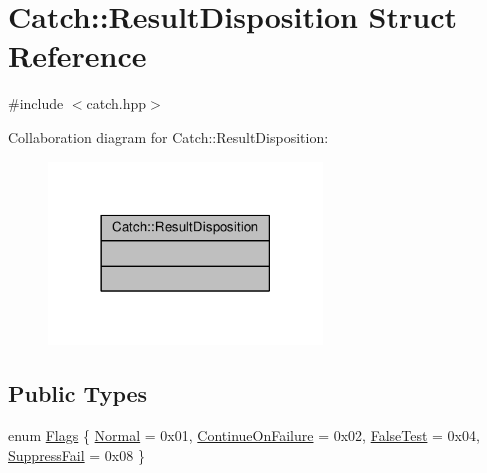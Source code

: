 \hypertarget{struct_catch_1_1_result_disposition}{\section{Catch\-:\-:Result\-Disposition Struct Reference}
\label{struct_catch_1_1_result_disposition}
}


{\ttfamily \#include $<$catch.\-hpp$>$}



Collaboration diagram for Catch\-:\-:Result\-Disposition\-:
\nopagebreak
\begin{figure}[H]
\begin{center}
\leavevmode
\includegraphics[width=206pt]{struct_catch_1_1_result_disposition__coll__graph}
\end{center}
\end{figure}
\subsection*{Public Types}
\begin{DoxyCompactItemize}
\item 
enum \hyperlink{struct_catch_1_1_result_disposition_a3396cad6e2259af326b3aae93e23e9d8}{Flags} \{ \hyperlink{struct_catch_1_1_result_disposition_a3396cad6e2259af326b3aae93e23e9d8af3bd52347ed6f8796e8ce2f77bb39ea5}{Normal} = 0x01, 
\hyperlink{struct_catch_1_1_result_disposition_a3396cad6e2259af326b3aae93e23e9d8aa18c94bd60c5614e17a84c2ced3bbfd5}{Continue\-On\-Failure} = 0x02, 
\hyperlink{struct_catch_1_1_result_disposition_a3396cad6e2259af326b3aae93e23e9d8a9980604245f19884691f941dec03eeb8}{False\-Test} = 0x04, 
\hyperlink{struct_catch_1_1_result_disposition_a3396cad6e2259af326b3aae93e23e9d8a1a88eb6004bddee4ccae4b421991bf54}{Suppress\-Fail} = 0x08
 \}
\end{DoxyCompactItemize}


